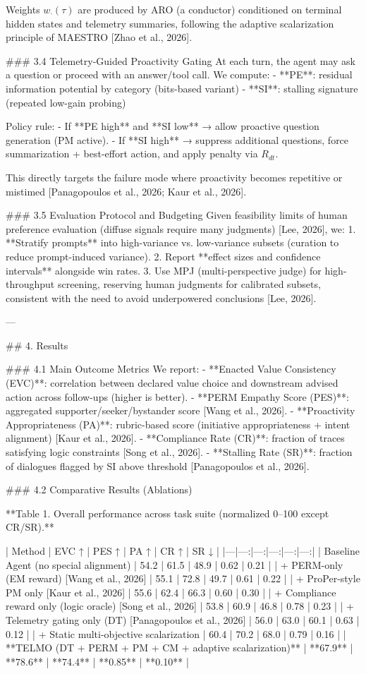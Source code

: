 Weights \(w_\cdot(\tau)\) are produced by ARO (a conductor) conditioned on terminal hidden states and telemetry summaries, following the adaptive scalarization principle of MAESTRO [Zhao et al., 2026].

### 3.4 Telemetry-Guided Proactivity Gating  
At each turn, the agent may ask a question or proceed with an answer/tool call. We compute:
- **PE**: residual information potential by category (bits-based variant)  
- **SI**: stalling signature (repeated low-gain probing)

Policy rule:  
- If **PE high** and **SI low** → allow proactive question generation (PM active).  
- If **SI high** → suppress additional questions, force summarization + best-effort action, and apply penalty via \(R_{dt}\).  

This directly targets the failure mode where proactivity becomes repetitive or mistimed [Panagopoulos et al., 2026; Kaur et al., 2026].

### 3.5 Evaluation Protocol and Budgeting  
Given feasibility limits of human preference evaluation (diffuse signals require many judgments) [Lee, 2026], we:
1. **Stratify prompts** into high-variance vs. low-variance subsets (curation to reduce prompt-induced variance).  
2. Report **effect sizes and confidence intervals** alongside win rates.  
3. Use MPJ (multi-perspective judge) for high-throughput screening, reserving human judgments for calibrated subsets, consistent with the need to avoid underpowered conclusions [Lee, 2026].

---

## 4. Results  

### 4.1 Main Outcome Metrics  
We report:  
- **Enacted Value Consistency (EVC)**: correlation between declared value choice and downstream advised action across follow-ups (higher is better).  
- **PERM Empathy Score (PES)**: aggregated supporter/seeker/bystander score [Wang et al., 2026].  
- **Proactivity Appropriateness (PA)**: rubric-based score (initiative appropriateness + intent alignment) [Kaur et al., 2026].  
- **Compliance Rate (CR)**: fraction of traces satisfying logic constraints [Song et al., 2026].  
- **Stalling Rate (SR)**: fraction of dialogues flagged by SI above threshold [Panagopoulos et al., 2026].

### 4.2 Comparative Results (Ablations)  

**Table 1. Overall performance across task suite (normalized 0–100 except CR/SR).**

| Method | EVC ↑ | PES ↑ | PA ↑ | CR ↑ | SR ↓ |
|---|---:|---:|---:|---:|---:|
| Baseline Agent (no special alignment) | 54.2 | 61.5 | 48.9 | 0.62 | 0.21 |
| + PERM-only (EM reward) [Wang et al., 2026] | 55.1 | 72.8 | 49.7 | 0.61 | 0.22 |
| + ProPer-style PM only [Kaur et al., 2026] | 55.6 | 62.4 | 66.3 | 0.60 | 0.30 |
| + Compliance reward only (logic oracle) [Song et al., 2026] | 53.8 | 60.9 | 46.8 | 0.78 | 0.23 |
| + Telemetry gating only (DT) [Panagopoulos et al., 2026] | 56.0 | 63.0 | 60.1 | 0.63 | 0.12 |
| + Static multi-objective scalarization | 60.4 | 70.2 | 68.0 | 0.79 | 0.16 |
| **TELMO (DT + PERM + PM + CM + adaptive scalarization)** | **67.9** | **78.6** | **74.4** | **0.85** | **0.10** |


